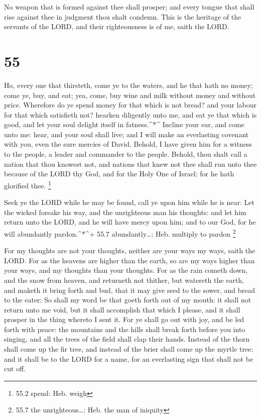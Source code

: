  No weapon that is formed against thee shall prosper; and
every tongue that shall rise against thee in judgment thou shalt
condemn. This is the heritage of the servants of the LORD, and their
righteousness is of me, saith the LORD.

\hypertarget{section-54}{%
\section{55}\label{section-54}}

 Ho, every one that thirsteth, come ye to the waters, and he
that hath no money; come ye, buy, and eat; yea, come, buy wine and milk
without money and without price.  Wherefore do ye spend
money for that which is not bread? and your labour for that which
satisfieth not? hearken diligently unto me, and eat ye that which is
good, and let your soul delight itself in fatness.\^{}*\^{} 
Incline your ear, and come unto me: hear, and your soul shall live; and
I will make an everlasting covenant with you, even the sure mercies of
David.  Behold, I have given him for a witness to the
people, a leader and commander to the people.  Behold, thou
shalt call a nation that thou knowest not, and nations that knew not
thee shall run unto thee because of the LORD thy God, and for the Holy
One of Israel; for he hath glorified thee. \footnote{55.2 spend: Heb.
  weigh}

 Seek ye the LORD while he may be found, call ye upon him
while he is near:  Let the wicked forsake his way, and the
unrighteous man his thoughts: and let him return unto the LORD, and he
will have mercy upon him; and to our God, for he will abundantly
pardon.\^{}*\^{}+ 55.7 abundantly\ldots: Heb. multiply to pardon
\footnote{55.7 the unrighteous\ldots: Heb. the man of iniquity}

 For my thoughts are not your thoughts, neither are your
ways my ways, saith the LORD.  For as the heavens are higher
than the earth, so are my ways higher than your ways, and my thoughts
than your thoughts.  For as the rain cometh down, and the
snow from heaven, and returneth not thither, but watereth the earth, and
maketh it bring forth and bud, that it may give seed to the sower, and
bread to the eater:  So shall my word be that goeth forth
out of my mouth: it shall not return unto me void, but it shall
accomplish that which I please, and it shall prosper in the thing
whereto I sent it.  For ye shall go out with joy, and be
led forth with peace: the mountains and the hills shall break forth
before you into singing, and all the trees of the field shall clap their
hands.  Instead of the thorn shall come up the fir tree,
and instead of the brier shall come up the myrtle tree: and it shall be
to the LORD for a name, for an everlasting sign that shall not be cut
off.

